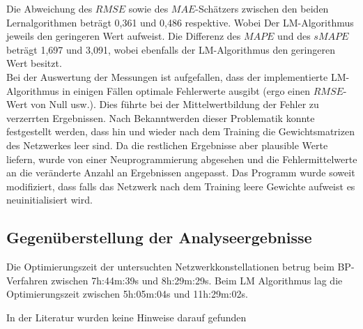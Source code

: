 Die Abweichung des $RMSE$ sowie des $MAE$-Schätzers zwischen den beiden Lernalgorithmen beträgt 0,361 und 0,486 respektive. Wobei Der LM-Algorithmus jeweils den geringeren Wert aufweist. Die Differenz des $MAPE$ und des $sMAPE$ beträgt 1,697 und 3,091, wobei ebenfalls der LM-Algorithmus den geringeren Wert besitzt. \\

Bei der Auswertung der Messungen ist aufgefallen, dass der implementierte LM-Algorithmus in einigen Fällen optimale Fehlerwerte ausgibt (ergo einen $RMSE$-Wert von Null usw.). Dies führte bei der Mittelwertbildung der Fehler zu verzerrten Ergebnissen. Nach Bekanntwerden dieser Problematik konnte festgestellt werden, dass hin und wieder nach dem Training die Gewichtsmatrizen des Netzwerkes leer sind. Da die restlichen Ergebnisse aber plausible Werte liefern, wurde von einer Neuprogrammierung abgesehen und die Fehlermittelwerte an die veränderte Anzahl an Ergebnissen angepasst. Das Programm wurde soweit modifiziert, dass falls das Netzwerk nach dem Training leere Gewichte aufweist es neuinitialisiert wird.

\newpage

\subsection{Gegenüberstellung der Analyseergebnisse}\label{sec:geg_aus_alg}

Die Optimierungszeit der untersuchten Netzwerkkonstellationen betrug beim BP-Verfahren zwischen 7h:44m:39s und 8h:29m:29s. Beim LM Algorithmus lag die Optimierungszeit zwischen 5h:05m:04s und 11h:29m:02s. 


In der Literatur wurden keine Hinweise darauf gefunden 